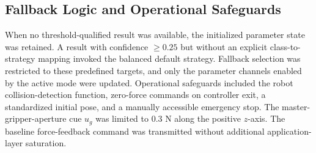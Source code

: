 \subsection{Fallback Logic and Operational Safeguards}
When no threshold-qualified result was available, the initialized parameter state was retained. A result with confidence $\geq 0.25$ but without an explicit class-to-strategy mapping invoked the balanced default strategy. Fallback selection was restricted to these predefined targets, and only the parameter channels enabled by the active mode were updated. Operational safeguards included the robot collision-detection function, zero-force commands on controller exit, a standardized initial pose, and a manually accessible emergency stop. The master-gripper-aperture cue $u_g$ was limited to 0.3 N along the positive $z$-axis. The baseline force-feedback command was transmitted without additional application-layer saturation.
